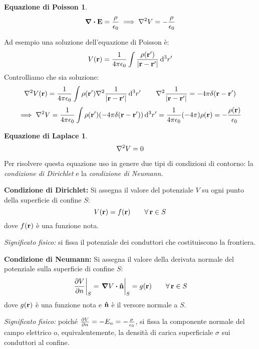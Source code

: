 \documentclass[12pt,a4paper]{article}
\begin{document}
\newtheorem*{EP}{Equazione di Poisson}
\begin{EP}
    \begin{equation*}
        \div \vb{E}= \frac{\rho}{\epsilon_0}\implies \laplacian V = -\frac{\rho}{\epsilon_0}
    \end{equation*}
\end{EP}

Ad esempio una soluzione dell'equazione di Poisson è:
\begin{equation*}
    V(\vb{r})= \frac{1}{4\pi \epsilon_0}\int \frac{\rho(\vb{r}')}{\abs{\vb{r}-\vb{r'}}} \dd[3]{r'}
\end{equation*}
Controlliamo che sia soluzione:
\begin{equation*}
    \laplacian{V(\vb{r})}= \frac{1}{4\pi \epsilon_0}\int \rho(\vb{r}')\laplacian \frac{1}{\abs{\vb{r}-\vb{r'}}} \dd[3]{r'} \qquad \laplacian \frac{1}{\abs{\vb{r}-\vb{r'}}}= -4\pi\delta(\vb{r}-\vb{r'})
\end{equation*}
\begin{equation*}
   \implies \laplacian{V}= \frac{1}{4\pi \epsilon_0}\int \rho(\vb{r}') (-4\pi\delta(\vb{r}-\vb{r'})) \dd[3]{r'}= \frac{1}{4\pi \epsilon_0}(-4\pi)\rho(\vb{r})= - \frac{\rho(\vb{r})}{\epsilon_0}
\end{equation*}

\newtheorem*{EL}{Equazione di Laplace}
\begin{EL}
    \begin{equation*}
        \laplacian V = 0
    \end{equation*}
\end{EL}

Per risolvere questa equazione uso in genere due tipi di condizioni di contorno: la \textit{condizione di Dirichlet} e la \textit{condizione di Neumann}.
\begin{definition}
    \textbf{Condizione di Dirichlet:} Si assegna il valore del potenziale $V$ su ogni punto della superficie di confine $S$:
    \[
        V(\vb{r}) = f(\vb{r}) \qquad \forall\,\vb{r} \in S
    \]
    dove $f(\vb{r})$ è una funzione nota.
\end{definition}
\textit{Significato fisico:} si fissa il potenziale dei conduttori che costituiscono la frontiera.

\begin{definition}
    \textbf{Condizione di Neumann:} Si assegna il valore della derivata normale del potenziale sulla superficie di confine $S$:
    \[
        \eval{\pdv{V}{n}}_{S} = \eval{\grad V \vdot \vu{n}}_{S} = g(\vb{r}) \qquad \forall\,\vb{r} \in S
    \]
    dove $g(\vb{r})$ è una funzione nota e $\vu{n}$ è il versore normale a $S$.
\end{definition}
\textit{Significato fisico:} poiché $\pdv{V}{n} = -E_n = -\frac{\sigma}{\epsilon_0}$, si fissa la componente normale del campo elettrico o, equivalentemente, la densità di carica superficiale $\sigma$ sui conduttori al confine.
\end{document}
